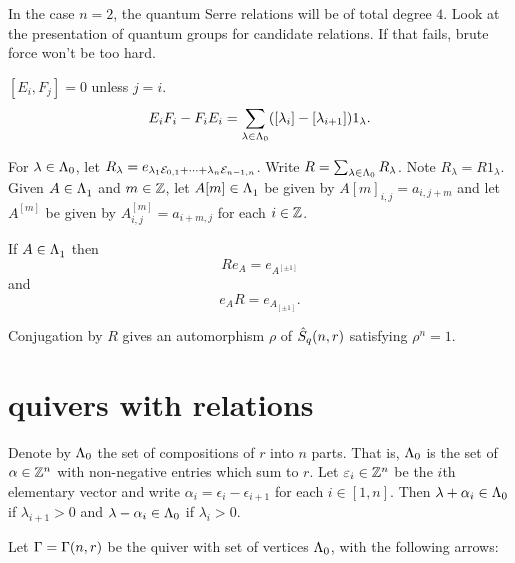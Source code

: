\documentclass[a4paper, 11pt]{report}
\begin{document}
\begin{lemma}[quantum Serre relations: $n=2$]
{\color{gray} In the case $n=2$, the quantum Serre relations will be of total degree $4$. Look at the presentation of quantum groups for candidate relations. If that fails, brute force won't be too hard.}
\end{lemma}

\begin{lemma}
$[E_i, F_j] = 0$ unless $j=i$.
\begin{equation*}
E_i F_i - F_i E_i = \sum_{\lambda\in{\Lambda_0}} ([\lambda_i] - [\lambda_{i+1}])1_\lambda.
\end{equation*}
\end{lemma}

{\color{gray}
For $\lambda\in{\Lambda_0}$, let $R_\lambda = e_{\lambda_1\mathcal{E}_{0,1}+\cdots +\lambda_n\mathcal{E}_{n-1,n}}$. Write $R = \sum_{\lambda\in{\Lambda_0}} R_\lambda$. Note $R_\lambda = R 1_\lambda$. Given $A\in\Lambda_1^{}$ and $m\in\mathbb{Z}$, let $A[m]\in\Lambda_1^{}$ be given by $A[m]_{i,j} = a_{i,j+m}$ and let $A^{[m]}$ be given by $A^{[m]}_{i,j} = a_{i+m,j}$ for each $i\in\mathbb{Z}$.

\begin{lemma}[Shifting]
If $A\in\Lambda_1^{}$ then
\begin{equation*}
R e_A = e_{A^{[\pm 1]}}
\end{equation*}
and
\begin{equation*}
e_A R = e_{A_{[\pm 1]}}.
\end{equation*}
\end{lemma}

Conjugation by $R$ gives an automorphism $\rho$ of $\hat{S}_q(n,r)$ satisfying $\rho^n = 1$.
}

\section{quivers with relations}

Denote by ${\Lambda_0}$ the set of compositions of $r$ into $n$ parts. That is, ${\Lambda_0}$ is the set of $\alpha\in\mathbb{Z}^n$ with non-negative entries which sum to $r$. Let $\varepsilon_i\in\mathbb{Z}^n$ be the $i$th elementary vector and write $\alpha_i = \epsilon_i  -\epsilon_{i+1}$ for each $i\in [1,n]$. Then $\lambda +\alpha_i\in{\Lambda_0}$ if $\lambda_{i+1}>0$ and $\lambda -\alpha_i\in{\Lambda_0}$ if $\lambda_i >0$.

Let $\Gamma=\Gamma(n,r)$ be the quiver with set of vertices ${\Lambda_0}$, with the following arrows:
\end{document}
